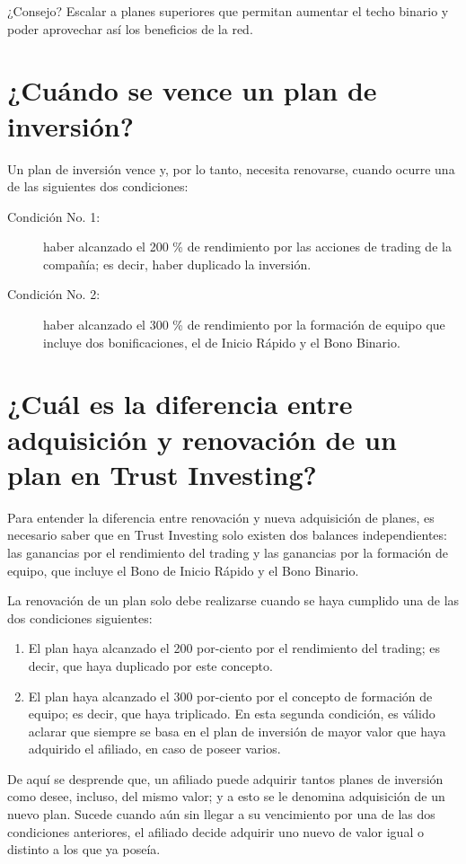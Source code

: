 \documentclass[12pt,letterpaper]{article}
\begin{document}
¿Consejo? Escalar a planes superiores que permitan aumentar el techo binario y poder aprovechar así los beneficios de la red.

\section{¿Cuándo se vence un plan de inversión?}
Un plan de inversión vence y, por lo tanto, necesita renovarse, cuando ocurre una de las siguientes dos condiciones:
\begin{description}
	\item[Condición No. 1:] haber alcanzado el 200 \% de rendimiento por las acciones de trading de la compañía; es decir, haber duplicado la inversión. 
	\item[Condición No. 2:] haber alcanzado el 300 \% de rendimiento por la formación de equipo que incluye dos bonificaciones, el de Inicio Rápido y el Bono Binario.
\end{description}
  
  \section{¿Cuál es la diferencia entre adquisición y renovación de un plan en Trust Investing?}
  Para entender la diferencia entre renovación y nueva adquisición de planes, es necesario saber que en Trust Investing solo existen dos balances independientes: las ganancias por el rendimiento del trading y las ganancias por la formación de equipo, que incluye el Bono de Inicio Rápido y el Bono Binario.
  
  La renovación de un plan solo debe realizarse cuando se haya cumplido una de las dos condiciones siguientes:
  
  \begin{enumerate}
  	\item El plan haya alcanzado el 200 por-ciento por el rendimiento del trading; es decir, que haya duplicado por este concepto.
  	\item El plan haya alcanzado el 300 por-ciento por el concepto de formación de equipo; es decir, que haya triplicado. En esta segunda condición, es válido aclarar que siempre se basa en el plan de inversión de mayor valor que haya adquirido el afiliado, en caso de poseer varios.
  \end{enumerate}
   
   De aquí se desprende que, un afiliado puede adquirir tantos planes de inversión como desee, incluso, del mismo valor; y a esto se le denomina adquisición de un nuevo plan. Sucede cuando aún sin llegar a su vencimiento por una de las dos condiciones anteriores, el afiliado decide adquirir uno nuevo de valor igual o distinto a los que ya poseía.
   
\end{document}
